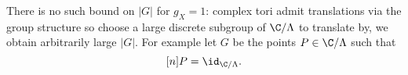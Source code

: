 \documentclass[a4paper]{article}
\begin{document}
\begin{remark}
  There is no such bound on \(|G|\) for \(g_X = 1\): complex tori admit translations via the group structure so choose a large discrete subgroup of \(\C/\Lambda\) to translate by, we obtain arbitrarily large \(|G|\). For example let \(G\) be the points \(P \in \C/\Lambda\) such that
  \[
    [n] P = \id_{\C/\Lambda}.
  \]
\end{remark}





\printindex
\end{document}
